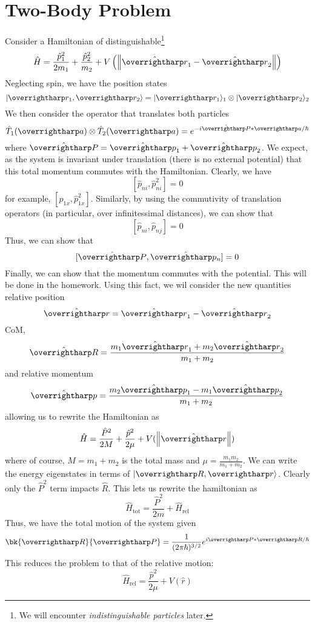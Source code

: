 \section{Two-Body Problem}
Consider a Hamiltonian of distinguishable\footnote{We will encounter \emph{indistinguishable particles} later.}
\begin{equation}
	\hat H = \frac{\hat p_1^2}{2m_1}+\frac{\hat p_2^2}{m_2} + V\left(\norm{\hat{\vv r}_1-\hat{\vv r}_2}\right)
\end{equation}
Neglecting spin, we have the position states
\[\k{\vv r_1, \vv r_2} = \k{\vv r_1}_1\tp \k{\vv r_2}_2\]
We then consider the operator that translates both particles
\[\hat T_1(\vv a)\tp\hat T_2(\vv a) = e^{-i\hat{\vv P}*\vv a/\hbar}\]
where \(\hat{\vv P}=\hat{\vv p}_1 + \hat{\vv p}_2\). We expect, as the system is invariant under translation (there is no external potential) that this total momentum commutes with the Hamiltonian. Clearly, we have
\[[\hat p_{ni},\hat p_{ni}^2]=0\]
for example, \([\hat p_{1x}, \hat p_{1x}^2]\). Similarly, by using the commutivity of translation operators (in particular, over infinitessimal distances), we can show that
\[[\hat p_{ni},\hat p_{nj}]=0\]
Thus, we can show that
\[[\hat{\vv P},\hat{\vv p_n}]=0\]
Finally, we can show that the momentum commutes with the potential. This will be done in the homework.
Using this fact, we wil consider the new quantities relative position
\[\hat{\vv r} = \hat{\vv r}_1 - \hat{\vv r}_2\]
CoM,
\[\hat{\vv R} = \frac{m_1\hat{\vv r}_1+m_2\hat{\vv r}_2}{m_1+m_2}\]
and relative momentum
\[\hat{\vv p} = \frac{m_2 \hat{\vv p}_1-m_1\hat{\vv p}_2}{m_1+m_2}\]
allowing us to rewrite the Hamiltonian as
\begin{equation}
	\hat H = \frac{\hat P^2}{2M} +\frac{\hat p^2}{2\mu}+V(\norm{\hat{\vv r}})
\end{equation}
where of course, \(M=m_1+m_2\) is the total mass and \(\mu = \frac{m_1m_2}{m_1+m_2}\). We can write the energy eigenstates in terms of \(\k{\vv R,\vv r}\). Clearly only the \(\hat P^2\) term impacts \(\hat R\). This lets us rewrite the hamiltonian as
\begin{equation}
	\hat H_{\text{tot}} = \frac{\hat P^2}{2m}+\hat H_{\text{rel}}
\end{equation}
Thus, we have the total motion of the system given
\[\bk{\vv R}{\vv P} = \frac{1}{(2\pi\hbar)^{3/2}}e^{i\vv P*\vv R/\hbar}\]
This reduces the problem to that of the relative motion:
\begin{equation}
	\hat H_{\text{rel}} = \frac{\hat p^2}{2\mu}+V(\hat r)
\end{equation}

